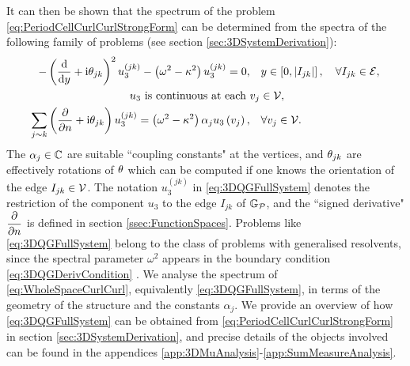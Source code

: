 It can then be shown that the spectrum of the problem \eqref{eq:PeriodCellCurlCurlStrongForm} can be determined from the spectra of the following family of problems (see section \ref{sec:3DSystemDerivation}):
\begin{subequations} \label{eq:3DQGFullSystem}
	\begin{align}
		- \left(  \dfrac{\mathrm{d}}{\mathrm{d}y} + \mathrm{i}\theta_{jk}  \right)^2 u_3^{(jk)} - \left( \omega^2-\kappa^2 \right)u_3^{(jk)} = 0, &\quad y\in\left[ 0,\left\lvert I_{jk} \right\rvert \right], \quad\forall I_{jk}\in\mathcal{E}, \\
		u_3 \text{ is continuous at each } & v_j\in\mathcal{V}, \\
		\sum_{j\sim k}\left(  \dfrac{\partial }{\partial n} + \mathrm{i}\theta_{jk}  \right)u_3^{(jk)} = \left( \omega^2-\kappa^2 \right)\alpha_j u_3\left( v_j \right), &\quad\forall v_j\in\mathcal{V}. \label{eq:3DQGDerivCondition}
	\end{align}
\end{subequations}
The $\alpha_j\in\mathbb{C}$ are suitable ``coupling constants" at the vertices, and $\theta_{jk}$ are effectively rotations of $\theta$ which can be computed if one knows the orientation of the edge $I_{jk}\in\mathcal{V}$.
The notation $u_3^{(jk)}$ in \eqref{eq:3DQGFullSystem} denotes the restriction of the component $u_3$ to the edge $I_{jk}$ of $\mathbb{G}_{\mathcal{P}}$, and the ``signed derivative" $\dfrac{\partial }{\partial n}$ is defined in section \ref{ssec:FunctionSpaces}.
Problems like \eqref{eq:3DQGFullSystem} belong to the class of problems with generalised resolvents, since the spectral parameter $\omega^2$ appears in the boundary condition \eqref{eq:3DQGDerivCondition} \cite{strauss1954generalized, strauss1968extensions, strauss1998functional, cherednichenko2018effective}.
We analyse the spectrum of \eqref{eq:WholeSpaceCurlCurl}, equivalently \eqref{eq:3DQGFullSystem}, in terms of the geometry of the structure and the constants $\alpha_j$.
We provide an overview of how \eqref{eq:3DQGFullSystem} can be obtained from \eqref{eq:PeriodCellCurlCurlStrongForm} in section \ref{sec:3DSystemDerivation}, and precise details of the objects involved can be found in the appendices \ref{app:3DMuAnalysis}-\ref{app:SumMeasureAnalysis}.